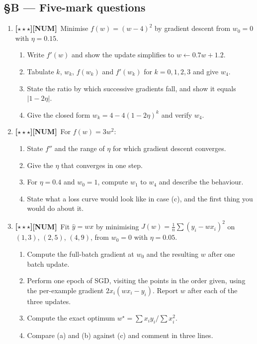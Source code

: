 \documentclass[11pt,a4paper]{article}
\newcommand{\LA}{{\footnotesize\textbf{[$\star\star\star$]}}}
\newcommand{\NUM}{{\footnotesize\textbf{[NUM]}}}
\newcommand{\Q}[1]{\item[\textbf{#1}]}
\begin{document}
\subsection*{§B --- Five-mark questions}

\begin{enumerate}[leftmargin=2.2cm]
\Q{U3.26}\LA\NUM\ Minimise $f(w) = (w-4)^2$ by gradient descent from
  $w_0 = 0$ with $\eta = 0.15$.
  \begin{enumerate}[label=(\alph*)]
    \item Write $f'(w)$ and show the update simplifies to $w \leftarrow 0.7w + 1.2$.
    \item Tabulate $k$, $w_k$, $f(w_k)$ and $f'(w_k)$ for $k = 0,1,2,3$ and
      give $w_4$.
    \item State the ratio by which successive gradients fall, and show it
      equals $|1 - 2\eta|$.
    \item Give the closed form $w_k = 4 - 4(1-2\eta)^k$ and verify $w_4$.
  \end{enumerate}
\Q{U3.27}\LA\NUM\ For $f(w) = 3w^2$:
  \begin{enumerate}[label=(\alph*)]
    \item State $f''$ and the range of $\eta$ for which gradient descent
      converges.
    \item Give the $\eta$ that converges in one step.
    \item For $\eta = 0.4$ and $w_0 = 1$, compute $w_1$ to $w_4$ and describe
      the behaviour.
    \item State what a loss curve would look like in case (c), and the first
      thing you would do about it.
  \end{enumerate}
\Q{U3.28}\LA\NUM\ Fit $\hat y = wx$ by minimising
  $J(w) = \frac1n\sum(y_i - wx_i)^2$ on $(1,3)$, $(2,5)$, $(4,9)$, from
  $w_0 = 0$ with $\eta = 0.05$.
  \begin{enumerate}[label=(\alph*)]
    \item Compute the full-batch gradient at $w_0$ and the resulting $w$ after
      one batch update.
    \item Perform one epoch of SGD, visiting the points in the order given,
      using the per-example gradient $2x_i(wx_i - y_i)$. Report $w$ after each
      of the three updates.
    \item Compute the exact optimum $w^\star = \sum x_iy_i / \sum x_i^2$.
    \item Compare (a) and (b) against (c) and comment in three lines.
  \end{enumerate}

\end{enumerate}
\end{document}
